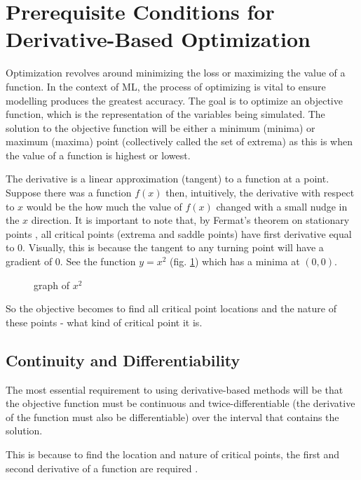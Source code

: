 \documentclass[10pt,a4paper]{report}
\begin{document}
		\section{Prerequisite Conditions for Derivative-Based Optimization}
			Optimization revolves around minimizing the loss or maximizing the value of a function. In the
			context of ML, the process of optimizing is vital to ensure modelling produces the greatest accuracy.
			The goal is to optimize an objective function, which is the
			representation of the variables being simulated. The solution to the objective function will be
			either a minimum (minima) or maximum (maxima) point (collectively called the set of extrema) as
			this is when the value of a function is highest or lowest. \par
			The derivative is a linear approximation (tangent) to a function at a point. Suppose there was a
			function $f(x)$ then, intuitively, the derivative with respect to $x$ would be the how much the value of $f(x)$
			changed with a small nudge in the $x$ direction. It is important to note that, by Fermat's theorem on stationary points
			\autocite{StationaryPoints}, all critical points (extrema and saddle points) have first derivative equal to 0. Visually, this
			is because the tangent to any turning point will have a gradient of 0. See the function $y = x^2$ (fig. \ref{fig:extrema}) which has a minima at $(0,0)$. \par
			\begin{figure}[h]
				\centering
				\caption{graph of $x^2$}
				\label{fig:extrema}
			\end{figure}
			So the objective becomes to find all critical point locations and the nature of these points - what kind of
			critical point it is.

			\subsection{Continuity and Differentiability}
				The most essential requirement to using derivative-based methods will be that the objective
				function must be continuous and twice-differentiable (the derivative of the function must also be differentiable)
				over the interval that contains the solution. \par
				This is because to find the location and nature of critical points, the first and second derivative
				of a function are required \autocite{SecondDerivativeTest}. \par
\end{document}

